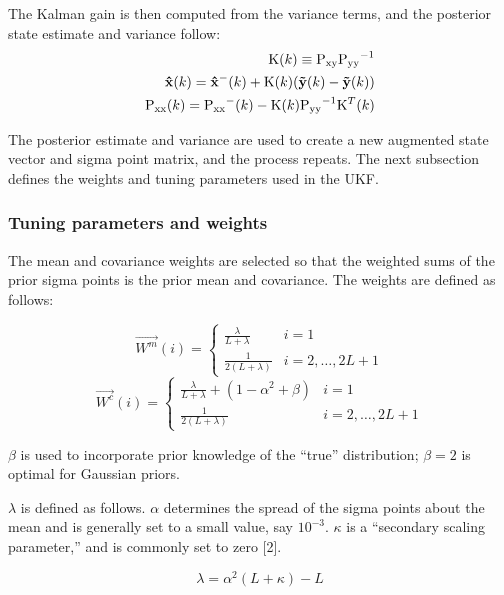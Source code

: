 The Kalman gain is then computed from the variance terms, and the posterior state estimate and variance follow:
\begin{align}
\mathrm{K}(k) \equiv \mathrm{P_{xy}}\mathrm{P_{yy}}^{-1}
\\
\mathrm{\mathbf{\hat{x}}}(k) = \mathrm{\mathbf{\hat{x}^-}}(k) + \mathrm{K}(k)(\mathrm{\mathbf{\tilde{y}}}(k)-\mathrm{\mathbf{\tilde{y}}}(k))
\\
{\mathrm{P_{xx}}}(k) = {\mathrm{P_{xx}}}^-(k) - \mathrm{K}(k)\mathrm{P_{yy}}^{-1} \mathrm{K}^T(k)
\end{align}

The posterior estimate and variance are used to create a new augmented state vector and sigma point matrix, and the process repeats.
The next subsection defines the weights and tuning parameters used in the UKF.

\subsubsection{Tuning parameters and weights}

The mean and covariance weights are selected so that the weighted sums of the prior sigma points is the prior mean and covariance.
The weights are defined as follows:

\begin{equation}
\vec{W^m}(i) = \begin{cases}
\frac{\lambda}{L + \lambda} & i = 1 \\
\frac{1}{2(L+\lambda)} & i = 2, \dots, 2L+1
\end{cases}
\end{equation}
\begin{equation}
\vec{W^c}(i) = \begin{cases}
\frac{\lambda}{L + \lambda}+(1-\alpha^2+\beta) & i = 1 \\
\frac{1}{2(L+\lambda)} & i = 2, \dots, 2L+1
\end{cases}
\end{equation}

$\beta$ is used to incorporate prior knowledge of the ``true'' distribution; $\beta = 2$ is optimal for Gaussian priors.

$\lambda$ is defined as follows.
$\alpha$ determines the spread of the sigma points about the mean and is generally set to a small value, say $10^{-3}$.
$\kappa$ is a ``secondary scaling parameter,'' and is commonly set to zero [2].

\begin{equation}
\lambda = \alpha^2(L+\kappa)-L
\end{equation}